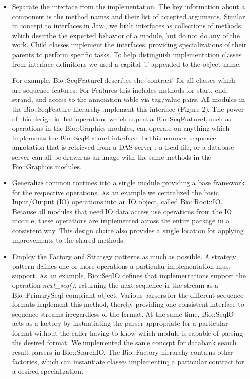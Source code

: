 \documentclass[12pt]{article}
\begin{document}
\begin{itemize}

\item Separate the interface from the implementation.  The key
information about a component is the method names and their list
of accepted arguments.  Similar in concept to interfaces in Java, we
built interfaces as collections of methods which describe the expected
behavior of a module, but do not do any of the work.  Child classes
implement the interfaces, providing specializations of their parents
to perform specific tasks.  To help distinguish implementation classes from
interface definitions we used a capital 'I' appended to the object
name.

For example, Bio::SeqFeatureI describes the `contract' for all classes
which are sequence features.  For Features this includes methods for
start, end, strand, and access to the annotation table via tag/value
pairs.  All modules in the Bio::SeqFeature hierarchy implement this
interface (Figure 2).  The power of this design is that operations
which expect a Bio::SeqFeatureI, such as operations in the
Bio::Graphics modules, can operate on anything which implements the
Bio::SeqFeatureI interface.  In this manner, sequence annotation that
is retrieved from a DAS server \cite{das}, a local file, or a database
server can all be drawn as an image with the same methods in the
Bio::Graphics modules.

\item Generalize common routines into a single module providing a base
framework for the respective operations.  As an example we centralized
the basic Input/Output (IO) operations into an IO object, called
Bio::Root::IO.  Because all modules that need IO data access use
operations from the IO module, these operations are implemented across
the entire package in a consistent way.  This design choice also
provides a single location for applying improvements to the shared
methods.

\item Employ the Factory and Strategy patterns \cite{gangoffour} as
much as possible. A strategy pattern defines one or more operations a
particular implementation must support. As an example, Bio::SeqIO
defines that implementations support the operation
\textit{next\_seq()}, returning the next sequence in the stream as a
Bio::PrimarySeqI compliant object. Various parsers for the different
sequence formats implement this method, thereby providing one
consistent interface to sequence streams irregardless of the
format. At the same time, Bio::SeqIO acts as a factory by
instantiating the parser appropriate for a particular format without
the caller having to know which module is capable of parsing the
desired format. We implemented the same concept for databank search
result parsers in Bio::SearchIO. The Bio::Factory hierarchy contains
other factories, which can instantiate classes implementing a
particular contract for a desired specialization.

\end{itemize}
\end{document}
